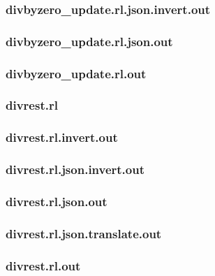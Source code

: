\subsubsection{divbyzero\_update.rl.json.invert.out}
\label{app:divbyzero_update_rl.json.invert.out}

\subsubsection{divbyzero\_update.rl.json.out}
\label{app:divbyzero_update_rl.json.out}

\subsubsection{divbyzero\_update.rl.out}
\label{app:divbyzero_update_rl.out}

\subsubsection{divrest.rl}
\label{app:divrest_rl}

\subsubsection{divrest.rl.invert.out}
\label{app:divrest_rl.invert.out}

\subsubsection{divrest.rl.json.invert.out}
\label{app:divrest_rl.json.invert.out}

\subsubsection{divrest.rl.json.out}
\label{app:divrest_rl.json.out}

\subsubsection{divrest.rl.json.translate.out}
\label{app:divrest_rl.json.translate.out}

\subsubsection{divrest.rl.out}
\label{app:divrest_rl.out}

